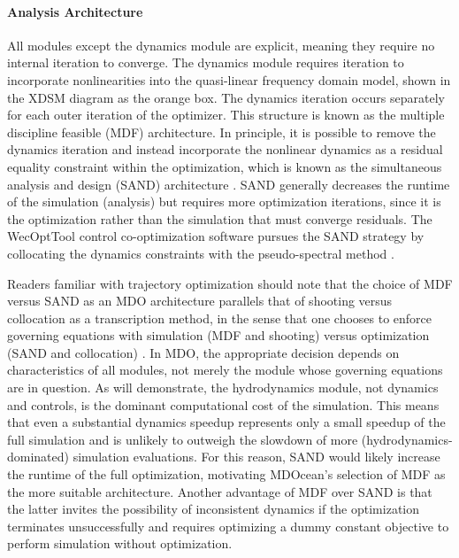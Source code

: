\paragraph{Analysis Architecture}
All modules except the dynamics module are explicit, meaning they require no internal iteration to converge.
The dynamics module requires iteration to incorporate nonlinearities into the quasi-linear frequency domain model, shown in the XDSM diagram as the orange box.
The dynamics iteration occurs separately for each outer iteration of the optimizer.
This structure is known as the multiple discipline feasible (MDF) architecture.
In principle, it is possible to remove the dynamics iteration and instead incorporate the nonlinear dynamics as a residual equality constraint within the optimization, which is known as the simultaneous analysis and design (SAND) architecture \citep{martins_multidisciplinary_2013}.
SAND generally decreases the runtime of the simulation (analysis) but requires more optimization iterations, since it is the optimization rather than the simulation that must converge residuals. 
The WecOptTool control co-optimization software pursues the SAND strategy by collocating the dynamics constraints with the pseudo-spectral method \citep{coe_initial_2020}.

Readers familiar with trajectory optimization should note that the choice of MDF versus SAND as an MDO architecture parallels that of shooting versus collocation as a transcription method, in the sense that one chooses to enforce governing equations with simulation (MDF and shooting) versus optimization (SAND and collocation) \citep{tedrake_underactuated_2024}.
In MDO, the appropriate decision depends on characteristics of all modules, not merely the module whose governing equations are in question.
As  will demonstrate, the hydrodynamics module, not dynamics and controls, is the dominant computational cost of the simulation.
This means that even a substantial dynamics speedup represents only a small speedup of the full simulation and is unlikely to outweigh the slowdown of more (hydrodynamics-dominated) simulation evaluations.
For this reason, SAND would likely increase the runtime of the full optimization, motivating MDOcean's selection of MDF as the more suitable architecture.
Another advantage of MDF over SAND is that the latter invites the possibility of inconsistent dynamics if the optimization terminates unsuccessfully \citep{martins_multidisciplinary_2013} and requires optimizing a dummy constant objective to perform simulation without optimization.

